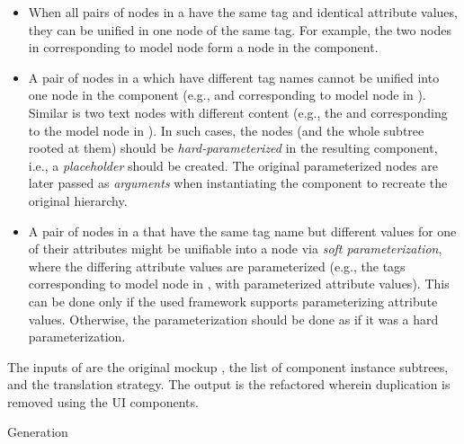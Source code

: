 \begin{itemize}[leftmargin=*]

	\item When all pairs of \dom nodes in a \mappedset have the same tag and identical attribute values,
	they can be unified in one \dom node of the same tag.
	For example, the two  nodes in 
	corresponding to model node 
	form a  node in the component.
	
	\item A pair of \dom nodes in a \mappedset which have different tag names
	cannot be unified into one \dom node in the component
	(e.g.,  and 
	corresponding to model node  in ).
	Similar is two text nodes with different content
	(e.g., the  and  corresponding to the model node  in ).
	In such cases, the \dom nodes (and the whole subtree rooted at them) should be \textit{hard-parameterized} in the resulting component,
	i.e., a \textit{placeholder} should be created.
	The original parameterized \dom nodes are later passed as \textit{arguments} when instantiating the component
	to recreate the original \dom hierarchy.
	
	\item A pair of \dom nodes in a \mappedset that have the same tag name but
	different values for one of their attributes
	might be unifiable into a \dom node 
	via \textit{soft parameterization},
	where the differing attribute values are parameterized
	(e.g., the  tags corresponding to model node 
	in ,
	with parameterized  attribute values).
	This can be done only if the used framework supports parameterizing attribute values.
	Otherwise, the parameterization should be done as if it was a hard parameterization.

\end{itemize}

The inputs of  are the original mockup \html, 
the list of component instance \dom subtrees,
and the translation strategy.
The output is the refactored \html wherein duplication is removed using the UI components.

\begin{algorithm}
	\fontsize{7.5pt}{9pt}\selectfont
	\caption{\model Generation}
	\label{algorithm:refactoring}
	
\end{algorithm}

